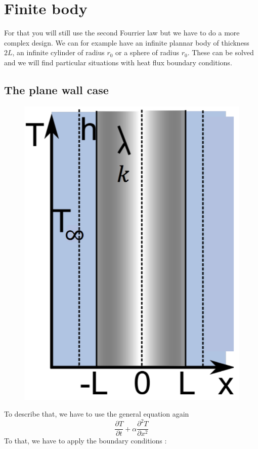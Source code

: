 \section{Finite body}
	For that you will still use the second Fourrier law but we have to do a more complex design. We can for example have an infinite plannar body of thickness $2L$, an infinite cylinder of radius $r_0$ or a sphere of radius $r_0$. These can be solved and we will find particular situations with heat flux boundary conditions. 
	
	\subsection{The plane wall case}
		\begin{figure}
		\vspace{-8mm}
		\includegraphics[scale=0.2]{ch4/6}
		\end{figure}	
		To describe that, we have to use the general equation again 
		\begin{equation}
			\frac{\partial T}{\partial t} + \alpha \frac{\partial ^2 T}{\partial x^2 }
		\end{equation}		 
	 	To that, we have to apply the boundary conditions :\\
	 	
